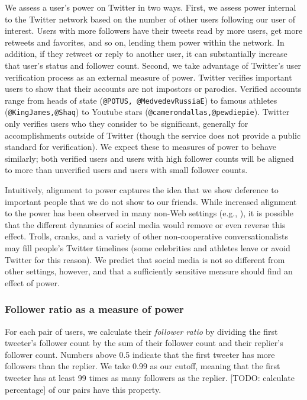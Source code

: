 \documentclass{acm_proc_article-sp}
\begin{document}
We assess a user's power on Twitter in two ways. First, we assess power internal to the Twitter network based on the number of other users following our user of interest.  Users with more followers have their tweets read by more users, get more retweets and favorites, and so on, lending them power within the network.  In addition, if they retweet or reply to another user, it can substantially increase that user's status and follower count.  Second, we take advantage of Twitter's user verification process as an external measure of power.  Twitter verifies important users to show that their accounts are not impostors or parodies.  Verified accounts range from heads of state (\texttt{@POTUS, @MedvedevRussiaE}) to famous athletes (\texttt{@KingJames,@Shaq}) to Youtube stars (\texttt{@camerondallas,@pewdiepie}). Twitter only verifies users who they consider to be significant, generally for accomplishments outside of Twitter (though the service does not provide a public standard for verification).  We expect these to measures of power to behave similarly; both verified users and users with high follower counts will be aligned to more than unverified users and users with small follower counts.

Intuitively, alignment to power captures the idea that we show deference to important people that we do not show to our friends. While increased alignment to the power has been observed in many non-Web settings (e.g., \cite{guo2015}), it is possible that the different dynamics of social media would remove or even reverse this effect.  Trolls, cranks, and a variety of other non-cooperative conversationalists may fill people's Twitter timelines (some celebrities and athletes leave or avoid Twitter for this reason). We predict that social media is not so different from other settings, however, and that a sufficiently sensitive measure should find an effect of power.

\subsubsection{Follower ratio as a measure of power} 

For each pair of users, we calculate their \textit{follower ratio} by dividing the first tweeter's follower count by the sum of their follower count and their replier's follower count.  Numbers above 0.5 indicate that the first tweeter has more followers than the replier.  We take 0.99 as our cutoff, meaning that the first tweeter has at least 99 times as many followers as the replier.  [TODO: calculate percentage] of our pairs have this property.  
\end{document}
